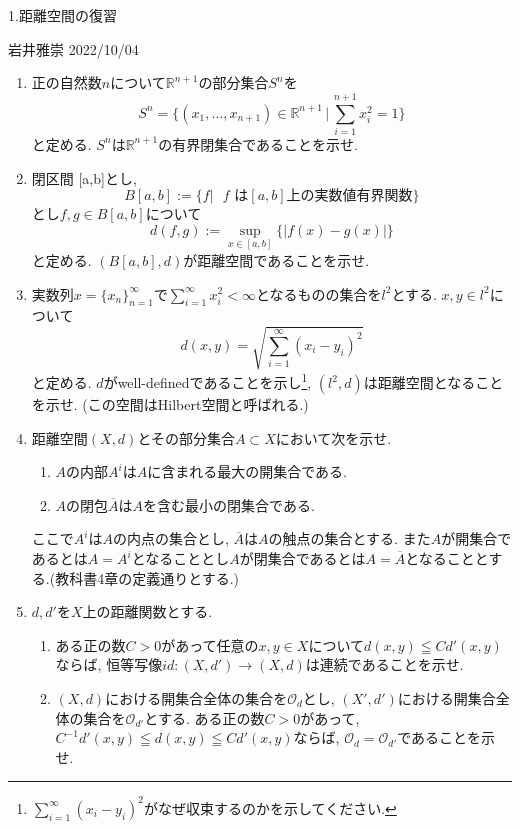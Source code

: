 \documentclass[dvipdfmx,a4paper,11pt]{article}
\newcommand{\R}{\mathbb{R}}
\theoremstyle{definition}
\begin{document}


\begin{center}
{\Large 1.距離空間の復習}
\end{center}
\begin{flushright}
 岩井雅崇 2022/10/04
\end{flushright}

\begin{enumerate}[label=\textbf{問}1.\arabic*]
\item 正の自然数$n$について$\R^{n+1}$の部分集合$S^n$を
$$
S^n = \{ (x_1, \ldots, x_{n+1}) \in \R^{n+1} \, |\,\sum_{i=1}^{n+1} x_{i}^{2} =1\}
$$
と定める. $S^n$は$\R^{n+1}$の有界閉集合であることを示せ.
\item 閉区間 [a,b]とし, 
$$
B[a,b]:= \{f | \text{ $f$ は$[a,b]$上の実数値有界関数} \}
$$
とし$f,g \in B[a,b]$について
$$
d(f,g) := \sup_{x \in [a,b]} \{ |f(x) - g(x)|\}
$$
と定める.  $(B[a,b],d)$が距離空間であることを示せ.


 \item  実数列$x = \{ x_n\}_{n=1}^{\infty}$で$\sum_{i=1}^{\infty} x_{i}^{2} < \infty$となるものの集合を$l^2$とする.
 $x,y \in l^2$について
 $$
 d(x,y) = \sqrt{ \sum_{i=1}^{\infty} (x_i - y_i)^2}
 $$
 と定める. $d$がwell-definedであることを示し\footnote{$\sum_{i=1}^{\infty} (x_i - y_i)^2$がなぜ収束するのかを示してください.}, $(l^2,d)$は距離空間となることを示せ. (この空間はHilbert空間と呼ばれる.)
 

  
 \item 距離空間$(X,d)$とその部分集合$A \subset X$において次を示せ.
	 \begin{enumerate}
 	\item $A$の内部$A^i$は$A$に含まれる最大の開集合である.
 	\item $A$の閉包$\overline{A}$は$A$を含む最小の閉集合である.
 	\end{enumerate}
 ここで$A^i$は$A$の内点の集合とし, $\overline{A}$は$A$の触点の集合とする.
 また$A$が開集合であるとは$A = A^i$となることとし$A$が閉集合であるとは$A = \overline{A}$となることとする.(教科書4章の定義通りとする.)
 
\item $d,d'$を$X$上の距離関数とする. 
	\begin{enumerate}
	\item ある正の数$C>0$があって任意の$x,y \in X$について$d(x,y) \leqq Cd'(x,y)$ならば, 恒等写像$id : (X, d') \rightarrow (X,d)$は連続であることを示せ.
	\item $(X,d)$における開集合全体の集合を$\mathscr{O}_d$とし, $(X',d')$における開集合全体の集合を$\mathscr{O}_{d'}$とする. ある正の数$C>0$があって, $C^{-1} d'(x,y)\leqq d(x,y) \leqq Cd'(x,y)$ならば, $\mathscr{O}_d = \mathscr{O}_{d'}$であることを示せ.
	\end{enumerate}


\end{enumerate}
\end{document}
